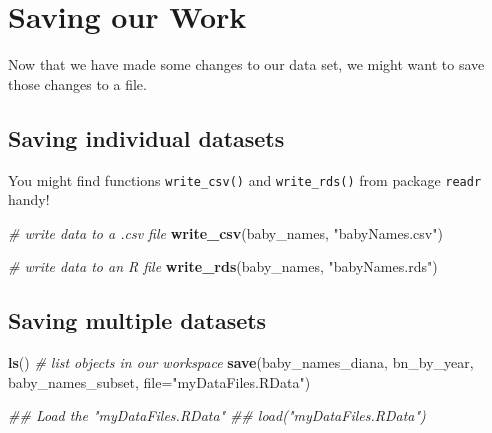 \documentclass[]{book}
\newenvironment{Shaded}{\begin{snugshade}}{\end{snugshade}}
\newcommand{\CommentTok}[1]{\textcolor[rgb]{0.56,0.35,0.01}{\textit{#1}}}
\newcommand{\DataTypeTok}[1]{\textcolor[rgb]{0.13,0.29,0.53}{#1}}
\newcommand{\KeywordTok}[1]{\textcolor[rgb]{0.13,0.29,0.53}{\textbf{#1}}}
\newcommand{\NormalTok}[1]{#1}
\newcommand{\StringTok}[1]{\textcolor[rgb]{0.31,0.60,0.02}{#1}}
\begin{document}
\hypertarget{saving-our-work}{%
\section{Saving our Work}\label{saving-our-work}}

Now that we have made some changes to our data set, we might want to
save those changes to a file.

\hypertarget{saving-individual-datasets}{%
\subsection{Saving individual datasets}\label{saving-individual-datasets}}

You might find functions \texttt{write\_csv()} and \texttt{write\_rds()} from package
\texttt{readr} handy!

\begin{Shaded}
\begin{Highlighting}[]
\CommentTok{# write data to a .csv file}
\KeywordTok{write_csv}\NormalTok{(baby_names, }\StringTok{"babyNames.csv"}\NormalTok{)}
\end{Highlighting}
\end{Shaded}

\begin{Shaded}
\begin{Highlighting}[]
\CommentTok{# write data to an R file}
\KeywordTok{write_rds}\NormalTok{(baby_names, }\StringTok{"babyNames.rds"}\NormalTok{)}
\end{Highlighting}
\end{Shaded}

\hypertarget{saving-multiple-datasets}{%
\subsection{Saving multiple datasets}\label{saving-multiple-datasets}}

\begin{Shaded}
\begin{Highlighting}[]
\KeywordTok{ls}\NormalTok{() }\CommentTok{# list objects in our workspace}
\KeywordTok{save}\NormalTok{(baby_names_diana, bn_by_year, baby_names_subset, }\DataTypeTok{file=}\StringTok{"myDataFiles.RData"}\NormalTok{)  }
\end{Highlighting}
\end{Shaded}

\begin{Shaded}
\begin{Highlighting}[]
\CommentTok{## Load the "myDataFiles.RData"}
\CommentTok{## load("myDataFiles.RData") }
\end{Highlighting}
\end{Shaded}
\end{document}
